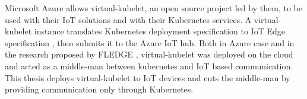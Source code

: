 Microsoft Azure allows virtual-kubelet, an open source project led by them, to be used with their IoT solutions and with their Kubernetes services\cite{Chandra2019}. A virtual-kubelet instance translates Kubernetes deployment specification to IoT Edge specification , then submits it to the Azure IoT hub. Both in Azure case and in the research proposed by FLEDGE \cite{fledge}, virtual-kubelet was deployed on the cloud and acted as a middle-man between kubernetes and IoT based communication. This thesis deploys virtual-kubelet to IoT devices and cuts the middle-man by providing communication only through Kubernetes.